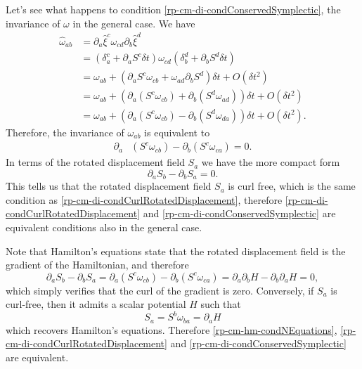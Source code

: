 Let's see what happens to condition \ref{rp-cm-di-condConservedSymplectic}, the invariance of $\omega$ in the general case. We have
\begin{equation}
	\begin{aligned}
	\hat{\omega}_{ab} &= \partial_a \hat{\xi}^c \omega_{cd} \partial_b \hat{\xi}^d \\ &= \left(\delta_a^c + \partial_a S^c \delta t\right) \omega_{cd} \left(\delta_b^d + \partial_b S^d \delta t\right) \\
	&= \omega_{ab} + \left(\partial_a S^c \omega_{cb} + \omega_{ad} \partial_b S^d \right) \delta t + O(\delta t^2) \\
	&= \omega_{ab} + \left(\partial_a (S^c \omega_{cb}) + \partial_b ( S^d \omega_{ad}) \right) \delta t + O(\delta t^2) \\
	&= \omega_{ab} + \left(\partial_a (S^c \omega_{cb}) - \partial_b ( S^d \omega_{d a}  ) \right) \delta t + O(\delta t^2).
	\end{aligned}
\end{equation}
Therefore, the invariance of $\omega_{ab}$ is equivalent to
\begin{equation}
	\begin{aligned}
	\partial_a &(S^c \omega_{cb} ) - \partial_b (S^c \omega_{ca} ) = 0.
	\end{aligned}
\end{equation}
In terms of the rotated displacement field $S_a$ we have the more compact form
\begin{equation}
	\partial_a S_b - \partial_b S_a = 0.
\end{equation}
This tells us that the rotated displacement field $S_a$ is curl free, which is the same condition as \ref{rp-cm-di-condCurlRotatedDisplacement}, therefore \ref{rp-cm-di-condCurlRotatedDisplacement} and \ref{rp-cm-di-condConservedSymplectic} are equivalent conditions also in the general case.

Note that Hamilton's equations state that the rotated displacement field is the gradient of the Hamiltonian, and therefore
\begin{equation}
	\partial_a S_b - \partial_b S_a = \partial_a (S^c \omega_{cb}) - \partial_b (S^c \omega_{ca}) =  \partial_a \partial_b H - \partial_b \partial_a H = 0,
\end{equation}
which simply verifies that the curl of the gradient is zero. Conversely, if $S_a$ is curl-free, then it admits a scalar potential $H$ such that
\begin{equation}
	S_a = S^b \omega_{ba} = \partial_a H
\end{equation}
which recovers Hamilton's equations. Therefore \ref{rp-cm-hm-condNEquations}, \ref{rp-cm-di-condCurlRotatedDisplacement} and \ref{rp-cm-di-condConservedSymplectic} are equivalent.

